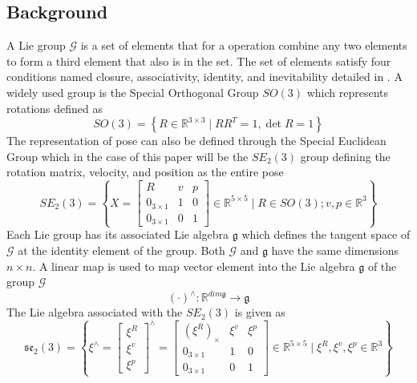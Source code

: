 \subsection{Background}
A Lie group $\mathcal{G}$ is a set of elements that for a operation combine any two elements to form a third element that also is in the set. The set of elements satisfy four conditions named closure, associativity, identity, and inevitability detailed in \cite{book}. A widely used group is the Special Orthogonal Group $SO(3)$ which represents rotations defined as \cite{book}
\begin{equation}
    SO(3)=\left\{R \in \mathbb{R}^{3 \times 3} \mid R R^T=1, \operatorname{det} R=1\right\}
    \label{eq: SO3 group}
\end{equation}
The representation of pose can also be defined through the Special Euclidean Group which in the case of this paper will be the $SE_2(3)$ group defining the rotation matrix, velocity, and position as the entire pose
\begin{equation}
    SE_2(3) = \left\{X = \begin{bmatrix}
    R & v & p\\
    0_{3 \times 1} & 1 & 0\\
    0_{3 \times 1} & 0 & 1
    \end{bmatrix} \in \mathbb{R}^{5 \times 5}
    \mid R \in SO(3); v, p \in \mathbb{R}^3\right\}
    \label{eq: SE3_2 group}
\end{equation}
Each Lie group has its associated Lie algebra $\mathfrak{g}$ which defines the tangent space of $\mathcal{G}$ at the identity element of the group. Both $\mathcal{G}$ and $\mathfrak{g}$ have the same dimensions $n \times n$. A linear map is used to map vector element into the Lie algebra $\mathfrak{g}$ of the group $\mathcal{G}$ \cite{Contact-Aided_Invarant_EKF}
\begin{equation}
    (\cdot)^{\wedge}: \mathbb{R}^{dim \mathfrak{g}} \rightarrow \mathfrak{g}
    \label{eq: linear map to g}
\end{equation}
The Lie algebra associated with the $SE_2(3)$ is given as 
\begin{equation}
    \mathfrak{s e}_2(3) =\left\{\xi^{\wedge} = 
    \begin{bmatrix}
         \xi^R \\
         \xi^v \\
         \xi^p
    \end{bmatrix}^{\wedge}
        =\begin{bmatrix}
    (\xi^R)_{\times} & \xi^v & \xi^p\\
    0_{3 \times 1} & 1 & 0\\
    0_{3 \times 1}  & 0 & 1
    \end{bmatrix} \in \mathbb{R}^{5 \times 5}
    \mid \xi^R, \xi^v, \xi^p \in \mathbb{R}^3\right\}
    \label{eq: se_2(3) lie algebra}
\end{equation}
